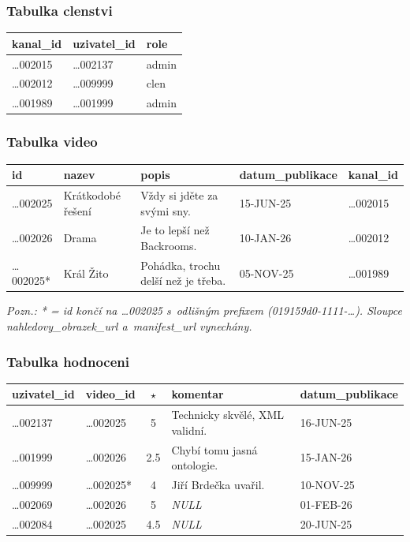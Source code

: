 \documentclass[12pt,a4paper]{article}
\begin{document}
\subsubsection{Tabulka clenstvi}

{%
\small\centering
\begin{tabular}{|l|l|l|}
\hline
\textbf{kanal\_id} & \textbf{uzivatel\_id} & \textbf{role} \\
\hline
…002015 & …002137 & admin \\
\hline
…002012 & …009999 & clen \\
\hline
…001989 & …001999 & admin \\
\hline
\end{tabular}
\par}

\subsubsection{Tabulka video}

{\small
\begin{tabularx}{\textwidth}{|l|l|X|l|l|}
\hline
\textbf{id} & \textbf{nazev} & \textbf{popis} & \textbf{datum\_publikace} & \textbf{kanal\_id} \\
\hline
…002025  & Krátkodobé řešení & Vždy si jděte za svými sny.          & 15-JUN-25 & …002015 \\
\hline
…002026  & Drama             & Je to lepší než Backrooms.           & 10-JAN-26 & …002012 \\
\hline
…002025* & Král Žito         & Pohádka, trochu delší než je třeba.  & 05-NOV-25 & …001989 \\
\hline
\end{tabularx}
}

\noindent\textit{Pozn.: * = id končí na …002025 s~odlišným prefixem (019159d0-1111-…).
Sloupce nahledovy\_obrazek\_url a~manifest\_url vynechány.}

\subsubsection{Tabulka hodnoceni}

{\small
\begin{tabularx}{\textwidth}{|l|l|c|X|l|}
\hline
\textbf{uzivatel\_id} & \textbf{video\_id} & \textbf{$\star$} & \textbf{komentar} & \textbf{datum\_publikace} \\
\hline
…002137 & …002025  & 5   & Technicky skvělé, XML validní.    & 16-JUN-25 \\
\hline
…001999 & …002026  & 2.5 & Chybí tomu jasná ontologie.       & 15-JAN-26 \\
\hline
…009999 & …002025* & 4   & Jiří Brdečka uvařil.   & 10-NOV-25 \\
\hline
…002069 & …002026  & 5   & \textit{NULL}                     & 01-FEB-26 \\
\hline
…002084 & …002025  & 4.5 & \textit{NULL}                     & 20-JUN-25 \\
\hline
\end{tabularx}
}
\end{document}
